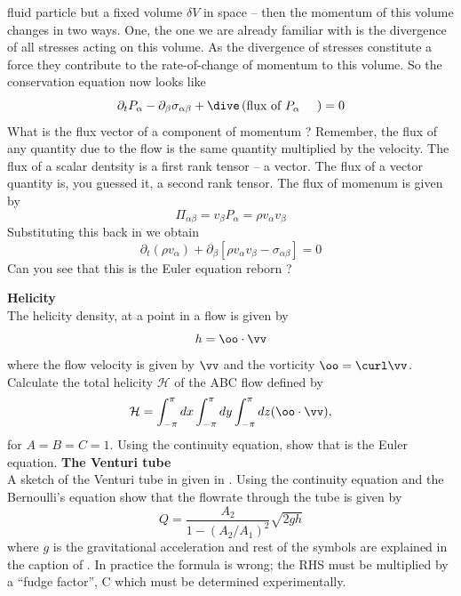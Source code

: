 fluid particle but a fixed volume $\delta V$ in space -- then the
momentum of this volume changes in two ways. One, the one we are
already familiar with is the divergence of all stresses acting on this
volume. As the divergence of stresses constitute a force they
contribute to the rate-of-change of momentum to this volume. So the
conservation equation now looks like 
\begin{equation}
\partial_t P_{\alpha} - \partial_{\beta}\sigma_{\alpha\beta} +
\dive\left(\parbox{2cm}{flux of  $P_{\alpha}$}\right) = 0 
\label{A2.2:mflux1}
\end{equation}
What is the flux vector of a component of momentum ? Remember, the
flux of any quantity due to the flow is the same quantity multiplied
by the velocity. The flux of a scalar dentsity is a first rank tensor
-- a vector. The flux of a vector quantity is, you guessed it, a
second rank tensor. The flux of momenum is given by 
\begin{equation}
\Pi_{\alpha\beta} = v_{\beta}P_{\alpha} = \rho v_{\alpha}v_{\beta} 
\label{A2.2:momflux}
\end{equation}
Substituting this back in  we obtain
\begin{equation}
\partial_t (\rho v_{\alpha}) + \partial_{\beta}\left[ \rho
  v_{\alpha}v_{\beta} - \sigma_{\alpha\beta} \right] = 0
\label{A2.2:EAgain}
\end{equation}
Can you see that this is the Euler equation reborn ? 
\begin{Exercise}
\label{Ex3}
\Question
\label{prb4.1}
{\bf Helicity}\\
The helicity density, at a point in  a flow is given by 
\begin{equation}
h = \oo\cdot\vv
\end{equation}
where the flow velocity is given by $\vv$ and the vorticity $\oo =
\curl \vv$. 
Calculate the total helicity $\mathcal{H}$ of the ABC flow 
defined by 
\begin{equation}
\mathcal{H} = \int_{-\pi}^{\pi}dx \int_{-\pi}^{\pi}dy
\int_{-\pi}^{\pi}dz (\oo\cdot\vv) \/,
\end{equation}
for $A=B=C=1$. 
\Question
\label{prb4.2}
Using the continuity equation, show that 
is the Euler equation. 
\Question
\label{prb4.3}
{\bf The Venturi tube} \\
A sketch of the Venturi tube in given in . Using the
continuity equation and the Bernoulli's equation show that the
flowrate through the tube is given by 
\begin{equation}
Q = \frac{A_2}{1-(A_2/A_1)^2}\sqrt{2gh}
\label{A2.2:venturi}
\end{equation}
where $g$ is the gravitational acceleration and rest of the symbols
are explained in the caption of . In practice the
formula is wrong; the RHS must be multiplied by a ``fudge factor'', C
which must be determined experimentally. 
\end{Exercise}

